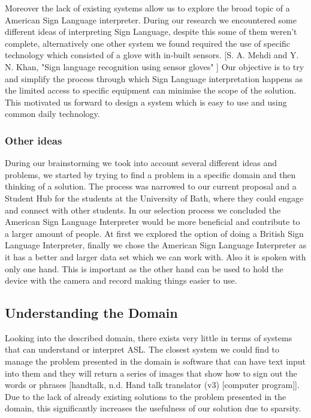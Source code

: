 \documentclass[10pt]{article}
\begin{document}
Moreover the lack of existing systems allow us to explore the broad topic of a American Sign 
Language interpreter. During our research we encountered some different ideas of interpreting Sign 
Language, despite this some of them weren't complete, alternatively one other system we found 
required the use of specific technology which consisted of a glove with in-built sensors. [S. A. 
Mehdi and Y. N. Khan, "Sign language recognition using sensor gloves" ] Our objective is to try and 
simplify the process through which Sign Language interpretation happens as the limited access to 
specific equipment can minimise the scope of the solution. This motivated us forward to design a 
system which is easy to use and using common daily technology. 

\subsubsection{Other ideas}

During our brainstorming we took into account several different ideas and problems, we started by 
trying to find a problem in a specific domain and then thinking of a solution. The process was 
narrowed to our current proposal and a Student Hub for the students at the University of Bath, where 
they could engage and connect with other students. In our selection process we concluded the 
American Sign Language Interpreter would be more beneficial and contribute to a larger amount of 
people. At first we explored the option of doing a British Sign Language Interpreter, finally we 
chose the American Sign Language Interpreter as it has a better and larger data set which we can 
work with. Also it is spoken with only one hand. This is important as the other hand can be used to 
hold the device with the camera and record making things easier to use. 

\subsection{Understanding the Domain}

Looking into the described domain, there exists very little in terms of systems that can understand 
or interpret ASL. The closest system we could find to manage the problem presented in the domain is 
software that can have text input into them and they will return a series of images that show how to 
sign out the words or phrases [handtalk, n.d. Hand talk translator (v3) [computer program]]. Due to 
the lack of already existing solutions to the problem presented in the domain, this significantly 
increases the usefulness of our solution due to sparsity.
\end{document}
